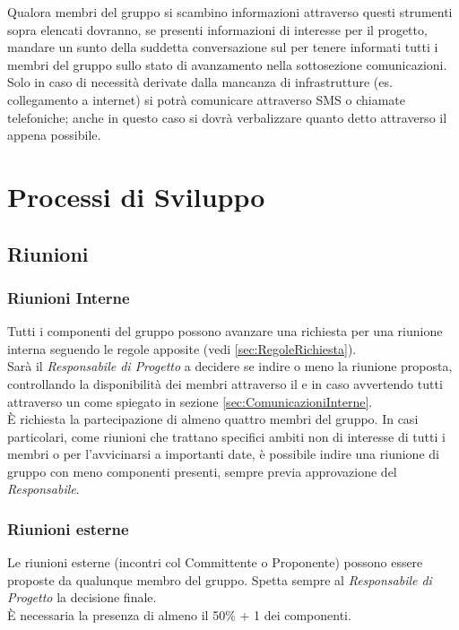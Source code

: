 \documentclass{scalatekids-article}
\begin{document}
Qualora membri del gruppo si scambino informazioni attraverso questi strumenti
sopra elencati dovranno, se presenti informazioni di interesse per il progetto,
mandare un sunto della suddetta conversazione sul  per tenere
informati tutti i membri del gruppo sullo stato di avanzamento nella
sottosezione comunicazioni.\\ Solo in caso di necessità derivate dalla mancanza
di infrastrutture (es. collegamento a internet) si potrà comunicare attraverso
SMS o chiamate telefoniche; anche in questo caso si dovrà verbalizzare quanto
detto attraverso il  appena possibile.

\section{Processi di Sviluppo}
\subsection{Riunioni}
\subsubsection{Riunioni Interne}
Tutti i componenti del gruppo possono avanzare una richiesta per una riunione
interna seguendo le regole apposite (vedi \ref{sec:RegoleRichiesta}).\\
Sarà il \textit{Responsabile di Progetto} a decidere se indire
o meno la riunione proposta, controllando la disponibilità dei membri attraverso il
 e in caso avvertendo tutti attraverso un  come
spiegato in sezione \ref{sec:ComunicazioniInterne}.\\ È richiesta la partecipazione di
almeno quattro membri del gruppo. In casi particolari, come riunioni che
trattano specifici ambiti non di interesse di tutti i membri o per l'avvicinarsi
a importanti date, è possibile indire una riunione di gruppo con meno componenti
presenti, sempre previa approvazione del \textit{Responsabile}.

\subsubsection{Riunioni esterne}
Le riunioni esterne (incontri col Committente o Proponente) possono essere
proposte da qualunque membro del gruppo. Spetta sempre al \textit{Responsabile
  di Progetto} la decisione finale.\\ È necessaria la presenza di almeno il
50\% + 1 dei componenti.
\end{document}
